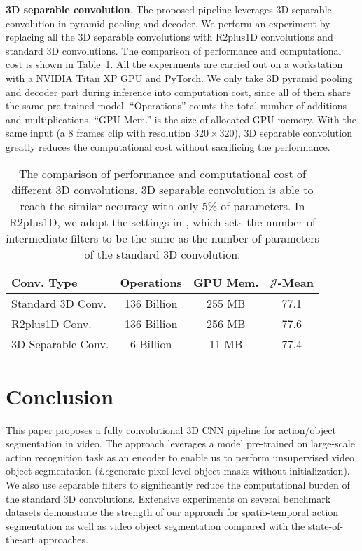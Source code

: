 \documentclass{bmvc2k}
\def\ie{\emph{i.e}\bmvaOneDot}
\begin{document}
\textbf{3D separable convolution}. The proposed pipeline leverages 3D separable convolution in pyramid pooling and decoder. We perform an experiment by replacing all the 3D separable convolutions with R2plus1D convolutions and standard 3D convolutions.
The comparison of performance and computational cost is shown in Table~\ref{tab:var_convs}. All the experiments are carried out on a workstation with a NVIDIA Titan XP GPU and PyTorch. We only take 3D pyramid pooling and decoder part during inference into computation cost, since all of them share the same pre-trained model. ``Operations'' counts the total number of additions and multiplications. ``GPU Mem.'' is the size of allocated GPU memory. With the same input (a $8$ frames clip with resolution $320\times320$), 3D separable convolution greatly reduces the computational cost without sacrificing the performance.


\begin{table}[!htbp]
\centering
\begin{tabular}{l|ccc}
\hline
Conv. Type          & Operations    & GPU Mem.  & $\mathcal{J}$-Mean \\
\hline
Standard 3D Conv.   & 136 Billion   & 255 MB    & 77.1\\
R2plus1D Conv.      & 136 Billion   & 256 MB    & 77.6\\
3D Separable Conv.  & 6 Billion     & 11 MB     & 77.4\\
\hline
\end{tabular}
\caption{The comparison of performance and computational cost of different 3D convolutions. 3D separable convolution is able to reach the similar accuracy with only 5\% of parameters. In R2plus1D, we adopt the settings in \cite{r2plus1d_cvpr18}, which sets the number of intermediate filters to be  the same as the number of parameters of the standard 3D convolution.} \label{tab:var_convs}
\end{table}


\section{Conclusion}
\label{sec:conclusion}
This paper proposes a fully convolutional 3D CNN pipeline for action/object segmentation in video. The approach leverages a model pre-trained on large-scale action recognition task as an encoder to enable us to perform unsupervised video object segmentation (\ie generate pixel-level object masks without initialization). We also use separable filters to significantly reduce the computational burden of the standard 3D convolutions. Extensive experiments on several benchmark datasets demonstrate the strength of our approach for spatio-temporal action segmentation as well as video object segmentation compared with the state-of-the-art approaches.
\end{document}
